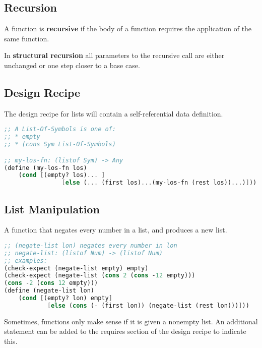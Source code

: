 \documentclass[english, 12pt]{article}
\begin{document}
\subsection{Recursion}
\begin{defn}
A function is \textbf{recursive} if the body of a function requires the application of the same function.
\end{defn}
\begin{defn}
In \textbf{structural recursion} all parameters to the recursive call are either unchanged or one step closer to a base case.
\end{defn}
\subsection{Design Recipe}
The design recipe for lists will contain a self-referential data definition.
\begin{lstlisting}[language=Scheme]
;; A List-Of-Symbols is one of:
;; * empty
;; * (cons Sym List-Of-Symbols)

;; my-los-fn: (listof Sym) -> Any
(define (my-los-fn los)
	(cond [(empty? los)... ]
				[else (... (first los)...(my-los-fn (rest los))...)]))
\end{lstlisting}

\subsection{List Manipulation}
\begin{exmp}
A function that negates every number in a list, and produces a new list.
\begin{lstlisting}[language=Scheme]
;; (negate-list lon) negates every number in lon
;; negate-list: (listof Num) -> (listof Num)
;; examples:
(check-expect (negate-list empty) empty)
(check-expect (negate-list (cons 2 (cons -12 empty)))
(cons -2 (cons 12 empty)))
(define (negate-list lon)
	(cond [(empty? lon) empty]
		  	[else (cons (- (first lon)) (negate-list (rest lon)))]))
\end{lstlisting}
\end{exmp}
\begin{note}
Sometimes, functions only make sense if it is given a nonempty list. An additional statement can be added to the requires section of the design recipe to indicate this.
\end{note}
\end{document}
